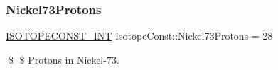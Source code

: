 \subsubsection{\texorpdfstring{Nickel73\+Protons}{Nickel73Protons}}
{\footnotesize\ttfamily \mbox{\hyperlink{group___isotope_const-_macros_ga5f18360b3e99483a35c32d789e62621c}{I\+S\+O\+T\+O\+P\+E\+C\+O\+N\+S\+T\+\_\+\+I\+NT}} Isotope\+Const\+::\+Nickel73\+Protons = 28}

\$ \$ Protons in Nickel-\/73. 